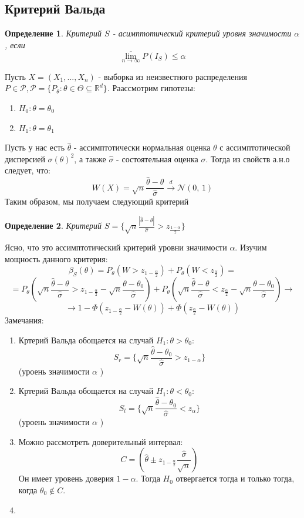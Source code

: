 \documentclass[a4paper,12pt]{article}
\newcommand{\normal}[2]{\mathcal{N}(#1,\,#2)}
\newcommand{\dconv}{\overset{d}{\to}}
\newcommand{\R}{\mathbb{R}}
\newtheorem{dfn}{Определение}[section]
\theoremstyle{named}
\begin{document}
\subsection{Критерий Вальда}
\begin{dfn}
    Критерий $S$ - асимптотический критерий уровня значимости $\alpha$, если 
    $$
    \overline{\lim_{n\to\infty}} P(I_S) \leq \alpha
    $$
\end{dfn}
Пусть $X = (X_1, ..., X_n)$ - выборка из неизвестного распределения $P\in\mathcal{P}, \mathcal{P}= \{P_\theta: \theta \in \Theta 
\subseteq \R^d \}$. Раассмотрим гипотезы:
\begin{enumerate}
    \item $H_0: \theta = \theta_0$
    \item $H_1: \theta = \theta_1$
\end{enumerate}
Пусть у нас есть $\hat\theta$ - ассимптотически нормальная оценка $\theta$ с ассимптотической дисперсией $\sigma(\theta)^2$, 
а также $\hat\sigma $ - состоятельная оценка $\sigma$. Тогда из свойств а.н.о следует, что:
$$
    W(X) = \sqrt{n}\frac{\hat\theta - \theta}{\hat\sigma} \dconv \normal{0}{1}
$$
Таким образом, мы получаем следующий критерий 
\begin{dfn}
    Критерий $S = \{ \sqrt{n}\frac{|\hat\theta - \theta|}{\hat\sigma} > z_{\frac{1-\alpha}{2}}\}$
\end{dfn}
Ясно, что это ассимптотический критерий уровни значимости $\alpha$. Изучим мощность данного критерия:
$$
    \beta_S(\theta) = P_\theta(W > z_{1 - \frac{\alpha}{2}}) + P_\theta(W < z_{\frac{\alpha}{2}}) = 
$$
$$
    = P_\theta(\sqrt{n}\frac{\hat\theta - \theta}{\hat\sigma} > z_{1-\frac{\alpha}{2}} - \sqrt{n}\frac{\theta - \theta_0}{\hat\sigma})
    + P_\theta(\sqrt{n}\frac{\hat\theta - \theta}{\hat\sigma} < z_{\frac{\alpha}{2}} - \sqrt{n}\frac{\theta - \theta_0}{\hat\sigma}) \to
$$
$$
    \to 1 - \Phi(z_{1-\frac{\alpha}{2}} - W(\theta)) + \Phi(z_{\frac{\alpha}{2}} - W(\theta))
$$
Замечания: 
\begin{enumerate}
    \item Кртерий Вальда обощается на случай $H_1: \theta > \theta_0$: 
    $$
    S_r = \{\sqrt{n}\frac{\hat\theta - \theta_0}{\hat\sigma} > z_{1-\alpha} \}
    $$
    (уроень значимости $\alpha$ )
    \item Кртерий Вальда обощается на случай $H_1: \theta < \theta_0$: 
    $$
    S_l = \{\sqrt{n}\frac{\hat\theta - \theta_0}{\hat\sigma} < z_{\alpha} \}
    $$
    (уроень значимости $\alpha$ )
    \item Можно рассмотреть доверительный интервал:
    $$
        C = (\hat\theta \pm z_{1-\frac{\alpha}{2}}\frac{\hat\sigma}{\sqrt{n}})
    $$
    Он имеет уровень доверия $1-\alpha$. Тогда $H_0$ отвергается тогда и только тогда, когда
    $\theta_0 \not\in C$.
    \item 
\end{enumerate}
\end{document}
